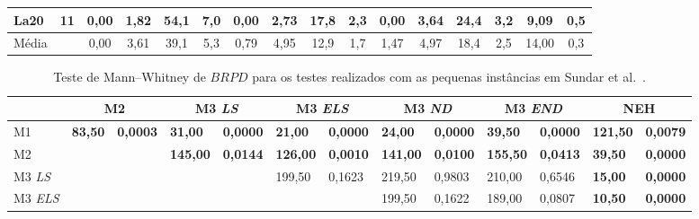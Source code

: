 \begin{landscape}
\begin{table}[H]
\begin{tabular}{ll|cccc|cccc|cccc|cc}
La20                       & 11                     & 0,00    & 1,82    & 54,1   & 7,0    & 0,00    & 2,73   & 17,8  & 2,3   & 0,00    & 3,64   & 24,4  & 3,2   & 9,09        & 0,5       \\ \hline
Média                      &                        & 0,00    & 3,61    & 39,1   & 5,3    & 0,79    & 4,95   & 12,9  & 1,7   & 1,47    & 4,97   & 18,4  & 2,5   & 14,00       & 0,3      
\end{tabular}
\end{table}
\end{landscape}

\begin{table}[H]
\caption{Teste de Mann–Whitney de $BRPD$ para os testes realizados com as pequenas instâncias em Sundar et al.~\cite{sundarHybridArtificialBee2017}.}
\label{tab:P2_hipothesis_BRPD}
\setlength{\tabcolsep}{3pt} %
\begin{tabular}{l|ll|ll|ll|ll|ll|ll}
                                 & \multicolumn{2}{c|}{M2}          & \multicolumn{2}{c|}{M3 \textit{LS}} & \multicolumn{2}{c|}{M3 \textit{ELS}} & \multicolumn{2}{c|}{M3 \textit{ND}} & \multicolumn{2}{c|}{M3 \textit{END}} & \multicolumn{2}{c}{NEH}           \\ \hline
M1                               & \textbf{83,50} & \textbf{0,0003} & \textbf{31,00}            & \textbf{0,0000}          & \textbf{21,00}            & \textbf{0,0000}           & \textbf{24,00}            & \textbf{0,0000}          & \textbf{39,50}            & \textbf{0,0000}           & \textbf{121,50} & \textbf{0,0079} \\
M2                               & \textbf{}      & \textbf{}       & \textbf{145,00}           & \textbf{0,0144}          & \textbf{126,00}           & \textbf{0,0010}           & \textbf{141,00}           & \textbf{0,0100}          & \textbf{155,50}           & \textbf{0,0413}           & \textbf{39,50}  & \textbf{0,0000} \\
M3 \textit{LS}  & \textbf{}      & \textbf{}       & \textbf{}                 & \textbf{}                & 199,50                    & 0,1623                    & 219,50                    & 0,9803                   & 210,00                    & 0,6546                    & \textbf{15,00}  & \textbf{0,0000} \\
M3 \textit{ELS} & \textbf{}      & \textbf{}       & \textbf{}                 & \textbf{}                & \textbf{}                 & \textbf{}                 & 199,50                    & 0,1622                   & 189,00                    & 0,0807                    & \textbf{10,50}  & \textbf{0,0000} \\

\end{tabular}
\end{table}
